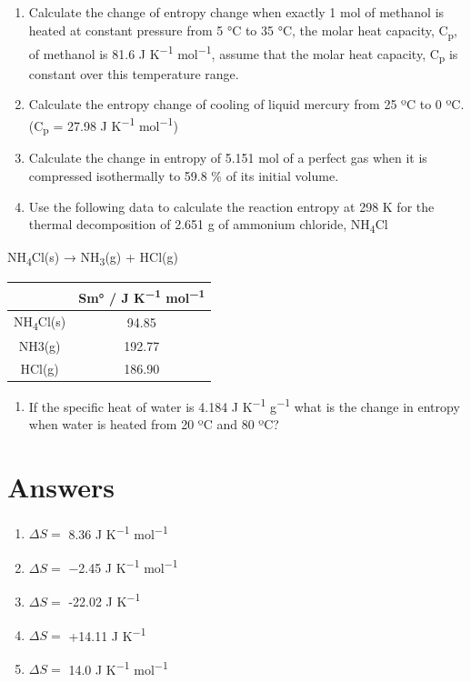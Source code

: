 \documentclass[
]{book}
\providecommand{\tightlist}{%
  \setlength{\itemsep}{0pt}\setlength{\parskip}{0pt}}
\begin{document}
\begin{enumerate}
\def\labelenumi{\arabic{enumi}.}
\item
  Calculate the change of entropy change when exactly 1 mol of methanol is heated at constant pressure from 5 °C to 35 °C, the molar heat capacity, C\textsubscript{p}, of methanol is 81.6 J K\textsuperscript{−1} mol\textsuperscript{−1}, assume that the molar heat capacity, C\textsubscript{p} is constant over this temperature range.
\item
  Calculate the entropy change of cooling of liquid mercury from 25 ºC to 0 ºC. (C\textsubscript{p} = 27.98 J K\textsuperscript{−1} mol\textsuperscript{−1})
\item
  Calculate the change in entropy of 5.151 mol of a perfect gas when it is compressed isothermally to 59.8 \% of its initial volume.
\item
  Use the following data to calculate the reaction entropy at 298 K for the thermal decomposition of 2.651 g of ammonium chloride, NH\textsubscript{4}Cl
\end{enumerate}

NH\textsubscript{4}Cl(s) → NH\textsubscript{3}(g) + HCl(g)

\begin{longtable}[]{@{}cc@{}}
\toprule
& Sm° / J K\textsuperscript{−1} mol\textsuperscript{−1}\tabularnewline
\midrule
\endhead
NH\textsubscript{4}Cl(s) & 94.85\tabularnewline
NH3(g) & 192.77\tabularnewline
HCl(g) & 186.90\tabularnewline
\bottomrule
\end{longtable}

\begin{enumerate}
\def\labelenumi{\arabic{enumi}.}
\setcounter{enumi}{4}
\tightlist
\item
  If the specific heat of water is 4.184 J K\textsuperscript{−1} g\textsuperscript{−1} what is the change in entropy when water is heated from 20 ºC and 80 ºC?
\end{enumerate}

\hypertarget{sec:w3p2ans}{%
\section{Answers}\label{sec:w3p2ans}}

\begin{enumerate}
\def\labelenumi{\arabic{enumi}.}
\item
  \(\Delta S=\) 8.36 J K\textsuperscript{−1} mol\textsuperscript{−1}
\item
  \(\Delta S=\) −2.45 J K\textsuperscript{−1} mol\textsuperscript{−1}
\item
  \(\Delta S=\) -22.02 J K\textsuperscript{−1}
\item
  \(\Delta S=\) +14.11 J K\textsuperscript{−1}
\item
  \(\Delta S=\) 14.0 J K\textsuperscript{−1} mol\textsuperscript{−1}
\end{enumerate}
\end{document}
